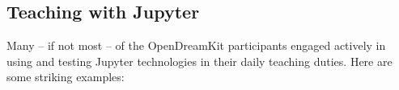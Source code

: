 \documentclass{deliverablereport}
\begin{document}



\subsection{Teaching with Jupyter}

Many -- if not most -- of the OpenDreamKit participants engaged
actively in using and testing Jupyter technologies in their daily
teaching duties. Here are some striking examples:
\end{document}
